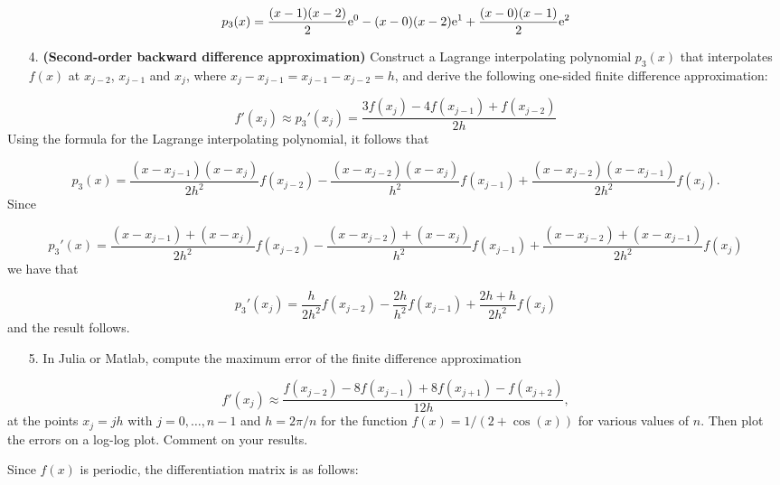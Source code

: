 \documentclass[12pt,a4paper]{article}
\begin{document}
\[
p_3(x) = \frac{(x-1)(x-2)}{2}{\rm e}^0 - (x-0)(x-2){\rm e}^1 + \frac{(x-0)(x-1)}{2}{\rm e}^2
\]
\begin{itemize}
\item[4. ] \textbf{(Second-order backward difference approximation)} Construct a Lagrange interpolating polynomial $p_3(x)$ that interpolates $f(x)$ at $x_{j-2}$, $x_{j-1}$ and $x_{j}$, where $x_{j}-x_{j-1} = x_{j-1}-x_{j-2} = h$, and derive the following one-sided finite difference approximation:  

\end{itemize}
\[
f'(x_j) \approx p_3'(x_j) = \frac{3f(x_j) - 4f(x_{j-1}) + f(x_{j-2})}{2h}
\]
Using the formula for the Lagrange interpolating polynomial, it follows that

\[
p_3(x) = \frac{(x-x_{j-1})(x-x_{j})}{2h^2} f(x_{j-2}) - \frac{(x-x_{j-2})(x-x_{j})}{h^2} f(x_{j-1}) +  \frac{(x-x_{j-2})(x-x_{j-1})}{2h^2} f(x_{j}).
\]
Since

\[
p_3'(x) = \frac{(x-x_{j-1}) + (x-x_{j})}{2h^2} f(x_{j-2}) - \frac{(x-x_{j-2})+ (x-x_{j})}{h^2} f(x_{j-1}) +  \frac{(x-x_{j-2}) + (x-x_{j-1})}{2h^2} f(x_{j})
\]
we have that

\[
p_3'(x_j) = \frac{h}{2h^2} f(x_{j-2}) - \frac{2h}{h^2} f(x_{j-1}) +  \frac{2h + h}{2h^2} f(x_{j})
\]
and the result follows.

\begin{itemize}
\item[5. ] In Julia or Matlab, compute the maximum error of the finite difference approximation 

\end{itemize}
\[
f'(x_j) \approx \frac{f(x_{j-2}) -8 f(x_{j-1}) + 8 f(x_{j+1}) - f(x_{j+2})}{12h},
\]
at the points $x_j = jh$ with $j = 0, \ldots, n-1$ and $h = 2\pi/n$ for the function $f(x) = 1/(2 + \cos(x))$ for various values of $n$.  Then plot the errors on a log-log plot. Comment on your results.

Since $f(x)$ is periodic, the differentiation matrix is as follows:
\end{document}
